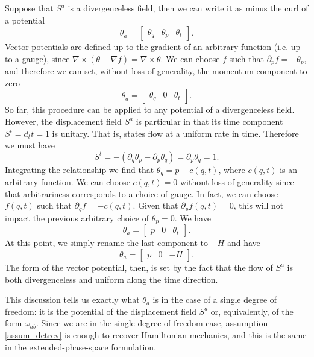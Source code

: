 Suppose that $S^a$ is a divergenceless field, then we can write it as minus the curl of a potential
\begin{equation}
	\theta_a = \begin{bmatrix}
	\theta_q & \theta_p & \theta_t
\end{bmatrix} .
\end{equation}
Vector potentials are defined up to the gradient of an arbitrary function (i.e. up to a gauge), since $\nabla \times (\theta + \nabla f) = \nabla \times \theta$. We can choose $f$ such that $\partial_p f = - \theta_p$, and therefore we can set, without loss of generality, the momentum component to zero
\begin{equation}
	\theta_a = \begin{bmatrix}
		\theta_q & 0 & \theta_t
	\end{bmatrix} .
\end{equation}
So far, this procedure can be applied to any potential of a divergenceless field. However, the displacement field $S^a$ is particular in that its time component $S^t = d_t t = 1$ is unitary. That is, states flow at a uniform rate in time. Therefore we must have
\begin{equation}
	S^t = - (\partial_q \theta_p - \partial_p \theta_q) = \partial_p \theta_q = 1.
\end{equation}
Integrating the relationship we find that $\theta_q = p + c(q, t)$, where $c(q,t)$ is an arbitrary function. We can choose $c(q,t) = 0$ without loss of generality since that arbitrariness corresponds to a choice of gauge. In fact, we can choose $f(q,t)$ such that $\partial_q f = - c(q,t)$. Given that $\partial_p f(q,t)=0$, this will not impact the previous arbitrary choice of $\theta_p = 0$. We have
\begin{equation}
	\theta_a = \begin{bmatrix}
		p & 0 & \theta_t
	\end{bmatrix}.
\end{equation}
At this point, we simply rename the last component to $-H$ and have
\begin{equation}
	\theta_a = \begin{bmatrix}
		p & 0 & -H
	\end{bmatrix}.
\end{equation}
The form of the vector potential, then, is set by the fact that the flow of $S^a$ is both divergenceless and uniform along the time direction.

This discussion tells us exactly what $\theta_a$ is in the case of a single degree of freedom: it is the potential of the displacement field $S^a$ or, equivalently, of the form $\omega_{ab}$. Since we are in the single degree of freedom case, assumption \ref{assum_detrev} is enough to recover Hamiltonian mechanics, and this is the same in the extended-phase-space formulation.

